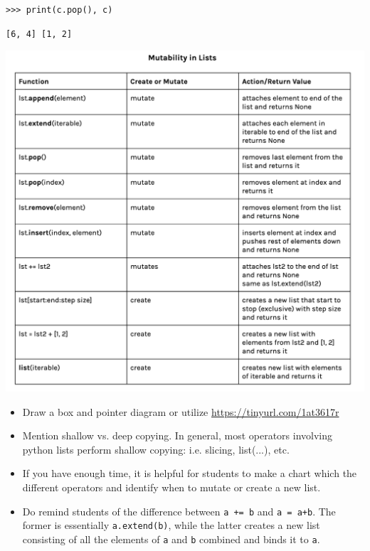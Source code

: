 \begin{blocksection}
\begin{lstlisting}
>>> print(c.pop(), c)
\end{lstlisting}
\begin{solution}[0.25in]
\begin{lstlisting}
[6, 4] [1, 2]
\end{lstlisting}

\includegraphics[width=.9\textwidth]{list-mutation.png}

\end{solution}
\end{blocksection}

\begin{blocksection}
\begin{guide}
\begin{itemize}
	\item Draw a box and pointer diagram or utilize \url {https://tinyurl.com/1at3617r}
	\item Mention shallow vs. deep copying. In general, most operators involving python lists perform shallow copying: i.e. slicing, list(...), etc.
	\item If you have enough time, it is helpful for students to make a chart which the different operators and identify when to mutate or create a new list.
    \item Do remind students of the difference between \lstinline{a += b} and \lstinline{a = a+b}. The former is essentially \lstinline{a.extend(b)}, while the latter creates a new list consisting of all the elements of \lstinline{a} and \lstinline{b} combined and binds it to \lstinline{a}.
\end{itemize}
\end{guide}
\end{blocksection}
